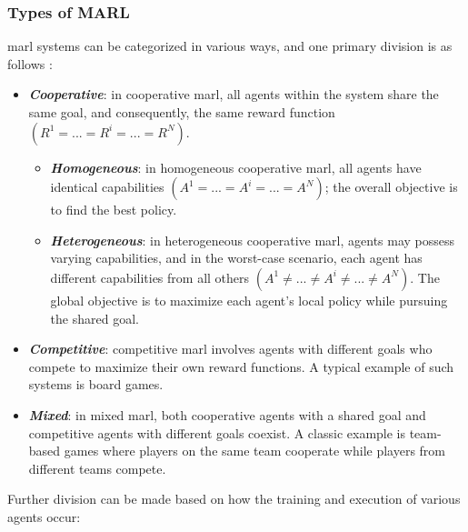 \documentclass[12pt,a4paper,openright,twoside]{book}
\begin{document}
\subsubsection{Types of MARL}
\ac{marl} systems can be categorized in various ways, and one primary division is as follows \cite{4445757}:

%     

\begin{itemize}
    \item \textbf{\textit{Cooperative}}: in cooperative \ac{marl}, all agents within the system share the same goal, and consequently, the same reward function $(R^1 = ... = R^i = ... = R^N)$.
    \begin{itemize}
        \item \textbf{\textit{Homogeneous}}: in homogeneous cooperative \ac{marl}, all agents have identical capabilities $(A^1 = ... = A^i = ... = A^N)$; the overall objective is to find the best policy. %
        \item \textbf{\textit{Heterogeneous}}: in heterogeneous cooperative \ac{marl}, agents may possess varying capabilities, and in the worst-case scenario, each agent has different capabilities from all others $(A^1 \neq ... \neq A^i \neq ... \neq A^N)$. The global objective is to maximize each agent's local policy while pursuing the shared goal.
    \end{itemize}
    \item \textbf{\textit{Competitive}}: competitive \ac{marl} involves agents with different goals who compete to maximize their own reward functions. A typical example of such systems is board games.
    \item \textbf{\textit{Mixed}}: in mixed \ac{marl}, both cooperative agents with a shared goal and competitive agents with different goals coexist. A classic example is team-based games where players on the same team cooperate while players from different teams compete.
\end{itemize}

Further division can be made based on how the training and execution of various agents occur:

%     
\end{document}
